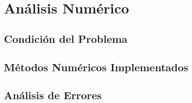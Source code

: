 \documentclass[a4paper,10pt,twocolumn]{article}
\begin{document}


\section{Análisis Numérico}\label{sec:numerico}


\subsection{Condición del Problema}\label{subsec:condicion}



\subsection{Métodos Numéricos Implementados}\label{subsec:metodos}



\subsection{Análisis de Errores}\label{subsec:errores}

\end{document}
